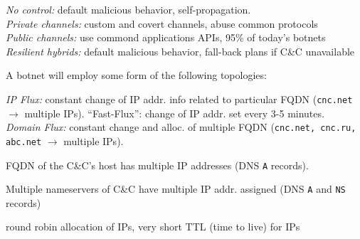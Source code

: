  \textit{No control:} default malicious behavior, self-propagation. \\
\textit{Private channels:} custom and covert channels, abuse common protocols\\
\textit{Public channels:} use commond applications APIs, 95\% of today's botnets \\
\textit{Resilient hybrids:} default malicious behavior, fall-back plans if C\&C  unavailable 

 A botnet will employ some form of the following topologies:


 \emph{IP Flux:} constant change of IP addr. info related to particular FQDN ({\tt cnc.net} $\to$ multiple IPs). ``Fast-Flux'': change of IP addr. set every 3-5 minutes. \\
\emph{Domain Flux:} constant change and alloc. of multiple FQDN ({\tt cnc.net, cnc.ru, abc.net} $\to$ multiple IPs).

 FQDN of the C\&C's host has multiple IP addresses (DNS {\tt A} records).

 Multiple nameservers of C\&C have multiple IP addr. assigned (DNS {\tt A} and {\tt NS} records)

 round robin allocation of IPs, very short TTL (time to live) for IPs


